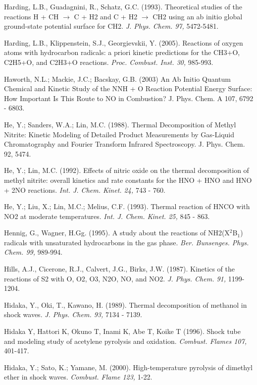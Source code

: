 \documentclass[12pt,landscape]{article}
\newcounter{reaction}
\begin{document}
Harding, L.B., Guadagnini, R., Schatz, G.C. (1993). Theoretical studies of the reactions H + CH $\rightarrow$ C + H2 and C + H2 $\rightarrow$ CH2 using an ab initio global ground-state potential surface for CH2. {\em J. Phys. Chem. 97,} 5472-5481.

Harding, L.B., Klippenstein, S.J., Georgievskii, Y. (2005). Reactions of oxygen atoms with hydrocarbon radicals: a priori kinetic predictions for the CH3+O, C2H5+O, and C2H3+O reactions. {\em Proc. Combust. Inst. 30,} 985-993.

Haworth, N.L.; Mackie, J.C.; Bacskay, G.B. (2003)  An Ab Initio Quantum Chemical and Kinetic Study of the NNH + O Reaction Potential Energy Surface: How Important Is This Route to NO in Combustion?   J. Phys. Chem. A  107,  6792 - 6803.

He, Y.; Sanders, W.A.; Lin, M.C. (1988).  Thermal Decomposition of Methyl Nitrite: Kinetic Modeling of Detailed Product Measurements by Gas-Liquid Chromatography and Fourier Transform Infrared Spectroscopy.   J. Phys. Chem. 92, 5474.

He, Y.; Lin, M.C. (1992).   Effects of nitric oxide on the thermal decomposition of methyl nitrite: overall kinetics and rate constants for the HNO + HNO and HNO + 2NO reactions.  {\em Int. J. Chem. Kinet. 24,} 743 - 760.

He, Y.; Liu, X.; Lin, M.C.; Melius, C.F. (1993).  Thermal reaction of HNCO with NO2 at moderate temperatures.  {\em Int. J. Chem. Kinet. 25,} 845 - 863.

Hennig, G., Wagner, H.Gg. (1995). A study about the reactions of NH2(X$^2$B$_1$) radicals with unsaturated hydrocarbons in the gas phase.  {\em Ber. Bunsenges. Phys. Chem. 99,} 989-994.

Hills, A.J., Cicerone, R.J., Calvert, J.G., Birks, J.W. (1987).  Kinetics of the reactions of S2 with O, O2, O3, N2O, NO, and NO2. {\em J. Phys. Chem. 91,} 1199-1204.

Hidaka, Y., Oki, T., Kawano, H. (1989).  Thermal decomposition of methanol in shock waves.  {\em J. Phys. Chem. 93,} 7134 - 7139.

Hidaka Y, Hattori K, Okuno T, Inami K, Abe T, Koike T (1996).  Shock tube and modeling study of acetylene pyrolysis and oxidation.  {\em Combust. Flames 107,} 401-417.

Hidaka, Y.; Sato, K.; Yamane, M. (2000).  High-temperature pyrolysis of dimethyl ether in shock waves. {\em Combust. Flame 123,} 1-22.
\end{document}
